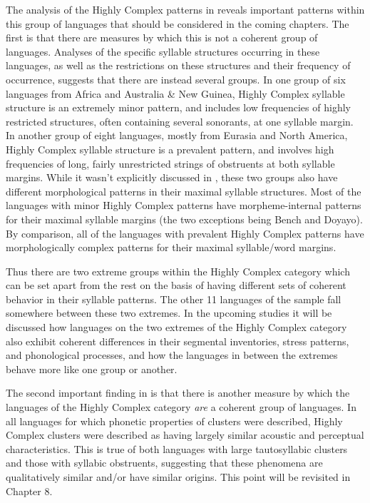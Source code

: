  The analysis of the Highly Complex patterns in  reveals important patterns within this group of languages that should be considered in the coming chapters. The first is that there are measures by which this is not a coherent group of languages. Analyses of the specific syllable structures occurring in these languages, as well as the restrictions on these structures and their frequency of occurrence, suggests that there are instead several groups. In one group of six languages from Africa and Australia \& New Guinea, Highly Complex syllable structure is an extremely minor pattern, and includes low frequencies of highly restricted structures, often containing several sonorants, at one syllable margin. In another group of eight languages, mostly from Eurasia and North America, Highly Complex syllable structure is a prevalent pattern, and involves high frequencies of long, fairly unrestricted strings of obstruents at both syllable margins. While it wasn’t explicitly discussed in , these two groups also have different morphological patterns in their maximal syllable structures. Most of the languages with minor Highly Complex patterns have morpheme-internal patterns for their maximal syllable margins (the two exceptions being Bench and Doyayo). By comparison, all of the languages with prevalent Highly Complex patterns have morphologically complex patterns for their maximal syllable/word margins.

  Thus there are two extreme groups within the Highly Complex category which can be set apart from the rest on the basis of having different sets of coherent behavior in their syllable patterns. The other 11 languages of the sample fall somewhere between these two extremes. In the upcoming studies it will be discussed how languages on the two extremes of the Highly Complex category also exhibit coherent differences in their segmental inventories, stress patterns, and phonological processes, and how the languages in between the extremes behave more like one group or another.

  The second important finding in  is that there is another measure by which the languages of the Highly Complex category \textit{are} a coherent group of languages. In all languages for which phonetic properties of clusters were described, Highly Complex clusters were described as having largely similar acoustic and perceptual characteristics. This is true of both languages with large tautosyllabic clusters and those with syllabic obstruents, suggesting that these phenomena are qualitatively similar and/or have similar origins. This point will be revisited in Chapter 8.

